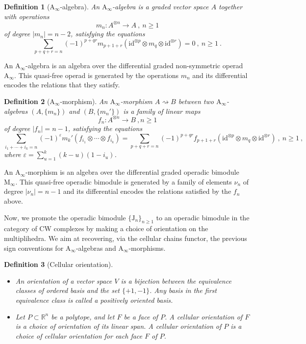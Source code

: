 \documentclass[twoside, 12pt]{amsart}
\newtheorem{definition}{Definition}[section]
\theoremstyle{remark}
\newcommand{\RR}{\mathbb{R}}
\newcommand{\J}{\mathrm{J}}
\newcommand{\id}{\mathrm{id}}
\newcommand{\Ainf}{\mathrm{A}_\infty} %
\newcommand{\Minf}{\mathrm{M}_\infty} %
\begin{document}
\begin{definition}[$\mathrm{A}_\infty$-algebra] An \emph{$\mathrm{A}_\infty$-algebra} is a graded vector space $A$ together with operations \[ m_n : A^{\otimes n} \to A \ , \ n\geq 1 \] of degree $|m_n|=n-2$, satisfying the equations \[\sum_{p+q+r=n } (-1)^{p+qr}m_{p+1+r}(\id^{\otimes p} \otimes m_q \otimes \id^{\otimes r}) = 0 \ , \ n\geq 1 \ .\]
\end{definition}

An $\mathrm{A}_\infty$-algebra is an algebra over the differential graded non-symmetric operad $\mathrm{A}_\infty$. This quasi-free operad is generated by the operations $m_n$ and its differential encodes the relations that they satisfy. 

\begin{definition}[$\mathrm{A}_\infty$-morphism] 
An \emph{$\mathrm{A}_\infty$-morphism} $A\rightsquigarrow B$ between two $\mathrm{A}_\infty$-algebras $(A,\{m_n\})$ and $(B,\{m_n'\})$ is a family of linear maps \[f_n : A^{\otimes n} \to B \ , n \geq 1\] of degree $|f_n|=n-1$, satisfying the equations  \[
  \sum_{i_1+\cdots+i_k=n} (-1)^{\varepsilon} m_k'(f_{i_1}\otimes\cdots\otimes f_{i_k}) = 
  \sum_{p+q+r=n} (-1)^{p+qr}f_{p+1+r}(\id^{\otimes p} \otimes m_q \otimes \id^{\otimes r})  \ , \ n\geq 1 \ ,\] where $\varepsilon = \sum_{u=1}^{k}(k-u)(1-i_u)$.
\end{definition}

An $\Ainf$-morphism is an algebra over the differential graded operadic bimodule $\Minf$. 
This quasi-free operadic bimodule is generated by a family of elements $\nu_n$ of degree $|\nu_n|=n-1$ and its differential encodes the relations satisfied by the $f_n$ above.

\medskip

Now, we promote the operadic bimodule $\{\J_n\}_{n\geq 1}$ to an operadic bimodule in the category of CW complexes by making a choice of orientation on the multiplihedra. We aim at recovering, via the cellular chains functor, the previous sign conventions for $\mathrm{A}_\infty$-algebras and $\mathrm{A}_\infty$-morphisms.

\begin{definition}[Cellular orientation] 
\leavevmode
\begin{itemize}
\item An \emph{orientation} of a vector space $V$ is a bijection between the equivalence classes of ordered basis and the set $\{+1,-1\}$. Any basis in the first equivalence class is called a \emph{positively oriented basis}.
\item Let $P\subset\RR^n$ be a polytope, and let $F$ be a face of $P$. A \emph{cellular orientation of $F$} is a choice of orientation of its linear span. A \emph{cellular orientation of $P$} is a choice of cellular orientation for each face $F$ of $P$. 
\end{itemize}
\end{definition}
\end{document}
